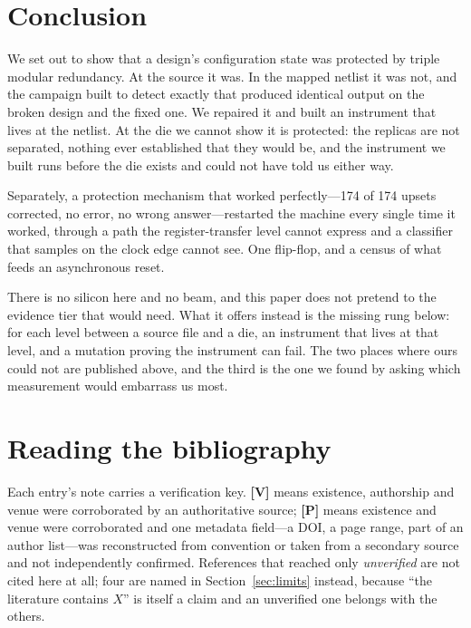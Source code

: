\documentclass[11pt,a4paper]{article}
\begin{document}
\section{Conclusion}
\label{sec:conclusion}

We set out to show that a design's configuration state was protected by
triple modular redundancy. At the source it was. In the mapped netlist it
was not, and the campaign built to detect exactly that produced identical
output on the broken design and the fixed one. We repaired it and built
an instrument that lives at the netlist. At the die we cannot show it is
protected: the replicas are not separated, nothing ever established that
they would be, and the instrument we built runs before the die exists and
could not have told us either way.

Separately, a protection mechanism that worked perfectly---174 of 174
upsets corrected, no error, no wrong answer---restarted the machine every
single time it worked, through a path the register-transfer level cannot
express and a classifier that samples on the clock edge cannot see. One
flip-flop, and a census of what feeds an asynchronous reset.

There is no silicon here and no beam, and this paper does not pretend to
the evidence tier that would need. What it offers instead is the missing
rung below: for each level between a source file and a die, an instrument
that lives at that level, and a mutation proving the instrument can fail.
The two places where ours could not are published above, and the third is
the one we found by asking which measurement would embarrass us most.

\section*{Reading the bibliography}

Each entry's note carries a verification key. \textbf{[V]} means
existence, authorship and venue were corroborated by an authoritative
source; \textbf{[P]} means existence and venue were corroborated and one
metadata field---a DOI, a page range, part of an author list---was
reconstructed from convention or taken from a secondary source and not
independently confirmed. References that reached only \emph{unverified}
are not cited here at all; four are named in
Section~\ref{sec:limits} instead, because ``the literature contains
$X$'' is itself a claim and an unverified one belongs with the others.



\end{document}
